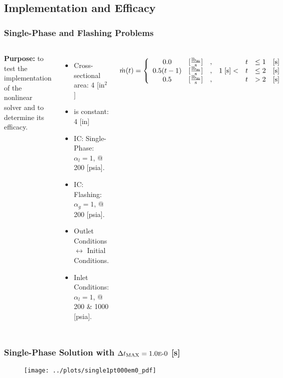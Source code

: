 \documentclass[compress,xcolor=table]{beamer}
\begin{document}
\subsection[Implementation \& Efficacy]{Implementation and Efficacy}
\begin{frame}
\frametitle{Single-Phase and Flashing Problems}
\begin{columns}

\textbf{Purpose:} to test the implementation of the nonlinear solver and to determine its efficacy.

\begin{itemize}
\item{Cross-sectional area: 4 [in$^2$]}
\item{\dx{} is constant: 4 [in]}
\item{IC: Single-Phase: $\alpha_{l} = 1$, @ 200 [psia].}
\item{IC: Flashing: $\alpha_{g}=1$, @ 200 [psia].}
\item{Outlet Conditions $\longleftrightarrow$ Initial Conditions.}
\item{Inlet Conditions: $\alpha_{l}=1$, @ 200 \& 1000 [psia].}
\end{itemize}
\begin{equation*}
\dot{m}(t) = \left\{
\begin{array}{cclrcll}
 0.0           & [\frac{ \lbm{} }{\text{s}}] & , &                & t & \leq 1 & [\text{s}] \\
 0.5 ( t - 1)  & [\frac{ \lbm{} }{\text{s}}] & , & 1\; [\text{s}] < & t & \leq 2 & [\text{s}] \\
 0.5           & [\frac{ \lbm{} }{\text{s}}] & , &                & t & > 2    & [\text{s}]
\end{array}\right.
\end{equation*}

\begin{figure}[h!t]
\centering
\resizebox{\textwidth}{0.6\textheight}{

}

\end{figure}
\end{columns}
\end{frame}
\begin{frame}
\frametitle{Single-Phase Solution with $\dtmax{} = \expneg{1.0}{0}$ [s]}

\begin{figure}[h!t]
\centering
\texttt{[image: ../plots/single1pt000em0\_pdf]}
\end{figure}

\end{frame}
\end{document}
